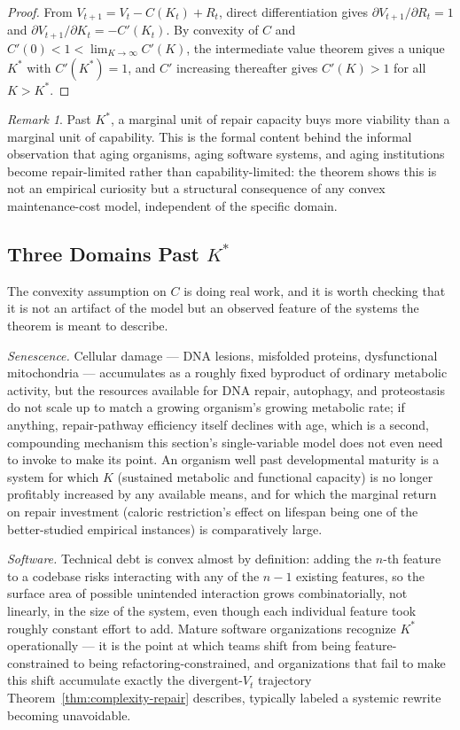 \documentclass[12pt,a4paper]{article}
\theoremstyle{plain}
\theoremstyle{definition}
\theoremstyle{remark}
\newtheorem{remark}[theorem]{Remark}
\begin{document}
\begin{proof}
From $V_{t+1} = V_t - C(K_t) + R_t$, direct differentiation gives $\partial V_{t+1}/\partial R_t = 1$ and $\partial V_{t+1}/\partial K_t = -C'(K_t)$. By convexity of $C$ and $C'(0)<1<\lim_{K\to\infty}C'(K)$, the intermediate value theorem gives a unique $K^\ast$ with $C'(K^\ast)=1$, and $C'$ increasing thereafter gives $C'(K)>1$ for all $K>K^\ast$.
\end{proof}

\begin{remark}
Past $K^\ast$, a marginal unit of repair capacity buys more viability than a marginal unit of capability. This is the formal content behind the informal observation that aging organisms, aging software systems, and aging institutions become repair-limited rather than capability-limited: the theorem shows this is not an empirical curiosity but a structural consequence of any convex maintenance-cost model, independent of the specific domain.
\end{remark}

\subsection{Three Domains Past $K^\ast$}
\label{subsec:three-domains}

The convexity assumption on $C$ is doing real work, and it is worth checking that it is not an artifact of the model but an observed feature of the systems the theorem is meant to describe.

\emph{Senescence.} Cellular damage — DNA lesions, misfolded proteins, dysfunctional mitochondria — accumulates as a roughly fixed byproduct of ordinary metabolic activity, but the resources available for DNA repair, autophagy, and proteostasis do not scale up to match a growing organism's growing metabolic rate; if anything, repair-pathway efficiency itself declines with age, which is a second, compounding mechanism this section's single-variable model does not even need to invoke to make its point. An organism well past developmental maturity is a system for which $K$ (sustained metabolic and functional capacity) is no longer profitably increased by any available means, and for which the marginal return on repair investment (caloric restriction's effect on lifespan being one of the better-studied empirical instances) is comparatively large.

\emph{Software.} Technical debt is convex almost by definition: adding the $n$-th feature to a codebase risks interacting with any of the $n-1$ existing features, so the surface area of possible unintended interaction grows combinatorially, not linearly, in the size of the system, even though each individual feature took roughly constant effort to add. Mature software organizations recognize $K^\ast$ operationally — it is the point at which teams shift from being feature-constrained to being refactoring-constrained, and organizations that fail to make this shift accumulate exactly the divergent-$V_t$ trajectory Theorem~\ref{thm:complexity-repair} describes, typically labeled a systemic rewrite becoming unavoidable.
\end{document}
